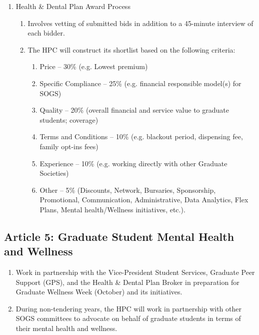 \begin{enumerate} [label*=\arabic*., align=left]
\item Health \& Dental Plan Award Process

\begin{enumerate}[label*=\arabic*., align=left]	
\item Involves vetting of submitted bids in addition to a 45-minute interview of each bidder.
\item The HPC will construct its shortlist based on the following criteria:
\begin{enumerate}
\item Price -- 30\% (e.g. Lowest premium)
\item Specific Compliance -- 25\% (e.g. financial responsible model(s) for SOGS)
\item Quality -- 20\% (overall financial and service value to graduate students; coverage)
\item Terms and Conditions -- 10\% (e.g. blackout period, dispensing fee, family opt-ins
fees)
\item Experience -- 10\% (e.g. working directly with other Graduate Societies)
\item Other -- 5\% (Discounts, Network, Bursaries, Sponsorship, Promotional,
Communication, Administrative, Data Analytics, Flex Plans, Mental health/Wellness initiatives, etc.).
\end{enumerate}
\end{enumerate}
\end{enumerate}

\subsection{Article 5: Graduate Student Mental Health and Wellness}
\begin{enumerate}[label*=\arabic*., align=left]	
\item Work in partnership with the Vice-President Student Services, Graduate Peer Support (GPS), and the Health
\& Dental Plan Broker in preparation for Graduate Wellness Week (October) and its initiatives.
\item During non-tendering years, the HPC will work in partnership with other SOGS committees to advocate on
behalf of graduate students in terms of their mental health and wellness.
\end{enumerate}
